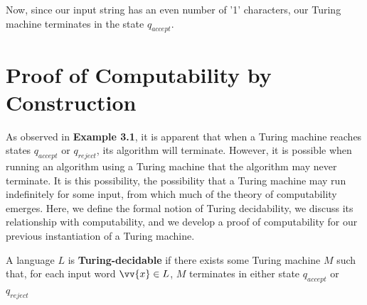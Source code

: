\documentclass{article}
\begin{document}
\noindent Now, since our input string has an even number of '1' characters, our Turing machine terminates in the state $q_{accept}$. \cite{1}

\section{Proof of Computability by Construction}
As observed in \textbf{Example 3.1}, it is apparent that when a Turing machine reaches states $q_{accept}$ or $q_{reject}$, its algorithm will terminate.  However, it is possible when running an algorithm using a Turing machine that the algorithm may never terminate.  It is this possibility, the possibility that a Turing machine may run indefinitely for some input, from which much of the theory of computability emerges.  Here, we define the formal notion of Turing decidability, we discuss its relationship with computability, and we develop a proof of computability for our previous instantiation of a Turing machine.

\begin{defin}
	A language $L$ is \textbf{Turing-decidable} if there exists some Turing machine $M$ such that, for each input word $\vv{x} \in L$, $M$ terminates in either state $q_{accept}$ or $q_{reject}$ \cite{1}
\end{defin}
\end{document}
